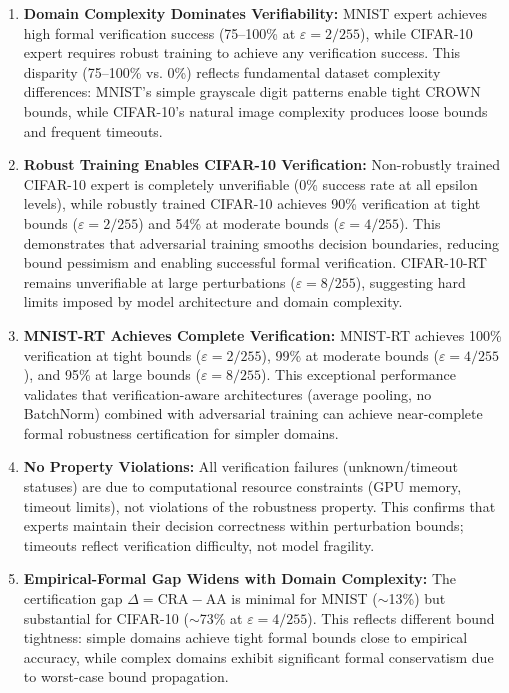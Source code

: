 \documentclass[11pt,a4paper]{article}
\begin{document}
\begin{enumerate}
    \item \textbf{Domain Complexity Dominates Verifiability:} MNIST expert achieves high formal verification success (75--100\% at $\varepsilon = 2/255$), while CIFAR-10 expert requires robust training to achieve any verification success. This disparity (75--100\% vs. 0\%) reflects fundamental dataset complexity differences: MNIST's simple grayscale digit patterns enable tight CROWN bounds, while CIFAR-10's natural image complexity produces loose bounds and frequent timeouts.

    \item \textbf{Robust Training Enables CIFAR-10 Verification:} Non-robustly trained CIFAR-10 expert is completely unverifiable (0\% success rate at all epsilon levels), while robustly trained CIFAR-10 achieves 90\% verification at tight bounds ($\varepsilon = 2/255$) and 54\% at moderate bounds ($\varepsilon = 4/255$). This demonstrates that adversarial training smooths decision boundaries, reducing bound pessimism and enabling successful formal verification. CIFAR-10-RT remains unverifiable at large perturbations ($\varepsilon = 8/255$), suggesting hard limits imposed by model architecture and domain complexity.

    \item \textbf{MNIST-RT Achieves Complete Verification:} MNIST-RT achieves 100\% verification at tight bounds ($\varepsilon = 2/255$), 99\% at moderate bounds ($\varepsilon = 4/255$), and 95\% at large bounds ($\varepsilon = 8/255$). This exceptional performance validates that verification-aware architectures (average pooling, no BatchNorm) combined with adversarial training can achieve near-complete formal robustness certification for simpler domains.

    \item \textbf{No Property Violations:} All verification failures (unknown/timeout statuses) are due to computational resource constraints (GPU memory, timeout limits), not violations of the robustness property. This confirms that experts maintain their decision correctness within perturbation bounds; timeouts reflect verification difficulty, not model fragility.

    \item \textbf{Empirical-Formal Gap Widens with Domain Complexity:} The certification gap $\Delta = \text{CRA} - \text{AA}$ is minimal for MNIST ($\sim$13\%) but substantial for CIFAR-10 ($\sim$73\% at $\varepsilon = 4/255$). This reflects different bound tightness: simple domains achieve tight formal bounds close to empirical accuracy, while complex domains exhibit significant formal conservatism due to worst-case bound propagation.
\end{enumerate}
\end{document}
